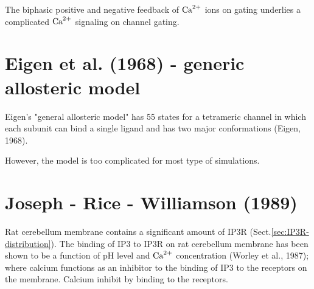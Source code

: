 The biphasic positive and negative feedback of ${\text{Ca}^{2+}}$ ions on \tIPthreeR gating
 underlies a complicated ${\text{Ca}^{2+}}$ signaling on channel gating.





\section{Eigen et al. (1968) - generic allosteric model}
\label{sec:eigen1968-IP3R}

Eigen's "general allosteric model" has 55 states for a tetrameric channel in
which each subunit can bind a single ligand and has two major conformations
(Eigen, 1968).

However, the model is too complicated for most type of simulations.

\section{Joseph - Rice - Williamson (1989)}
\label{sec:Joseph-Rice-Williamson-1989}
\label{sec:IP3R-Joseph-Rice-Williamson-1989}

Rat cerebellum membrane contains a significant amount of IP3R
(Sect.\ref{sec:IP3R-distribution}). The binding of IP3 to IP3R on rat cerebellum
membrane has been shown to be a function of pH level and ${\text{Ca}^{2+}}$ concentration
(Worley et al., 1987); where calcium functions as an inhibitor to the binding of
IP3 to the receptors on the membrane.
Calcium inhibit by binding to the receptors.

